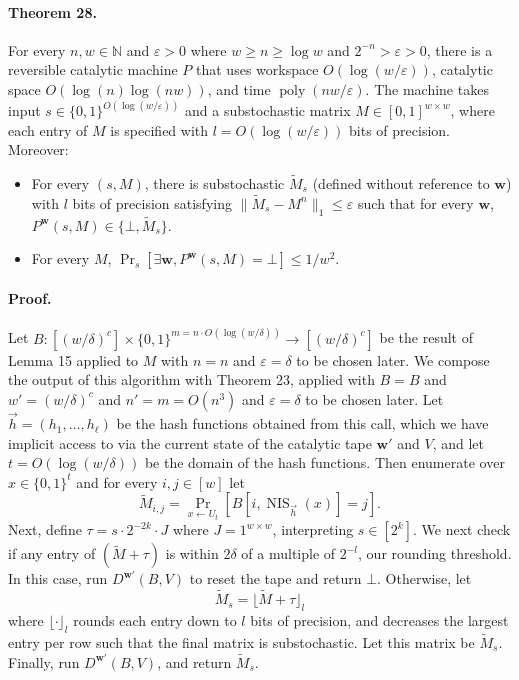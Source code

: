 \documentclass[10pt,a4paper]{article}
\begin{document}
\paragraph{Theorem 28.} For every $n,w\in\mathbb N$ and $\varepsilon>0$ where $w\geq n\geq\log w$ and $2^{-n}>\varepsilon>0$, there is a reversible catalytic machine $P$ that uses workspace $O(\log(w/\varepsilon))$, catalytic space $O(\log(n)\log(nw))$, and time $\operatorname{poly}(nw/\varepsilon)$. The machine takes input $s\in\{0,1\}^{O(\log(w/\varepsilon))}$ and a substochastic matrix $M\in[0,1]^{w\times w}$, where each entry of $M$ is specified with $l=O(\log(w/\varepsilon))$ bits of precision. Moreover:
\begin{itemize}
\item For every $(s,M)$, there is substochastic $\widetilde M_s$ (defined without reference to $\mathbf w$) with $l$ bits of precision satisfying $\|\widetilde M_s-M^n\|_1\leq\varepsilon$ such that for every $\mathbf w$, $P^{\mathbf w}(s,M)\in\{\bot,\widetilde M_s\}$.
\item For every $M$, $\Pr_s[\exists\mathbf w,P^{\mathbf w}(s,M)=\bot]\leq1/w^2$.
\end{itemize}
\paragraph{Proof.} Let $B:[(w/\delta)^c]\times\{0,1\}^{m=n\cdot O(\log(w/\delta))}\to[(w/\delta)^c]$ be the result of Lemma 15 applied to $M$ with $n=n$ and $\varepsilon=\delta$ to be chosen later. We compose the output of this algorithm with Theorem 23, applied with $B=B$ and $w'=(w/\delta)^c$ and $n'=m=O(n^3)$ and $\varepsilon=\delta$ to be chosen later. Let $\vec h=(h_1,\ldots,h_\ell)$ be the hash functions obtained from this call, which we have implicit access to via the current state of the catalytic tape $\mathbf w'$ and $V$, and let $t=O(\log(w/\delta))$ be the domain of the hash functions. Then enumerate over $x\in\{0,1\}^t$ and for every $i,j\in[w]$ let
\[\widetilde M_{i,j}=\Pr_{x\leftarrow U_t}[B[i,\operatorname{NIS}_{\vec h}(x)]=j].\]
Next, define $\tau=s\cdot2^{-2k}\cdot J$ where $J=1^{w\times w}$, interpreting $s\in[2^k]$. We next check if any entry of $(\widetilde M+\tau)$ is within $2\delta$ of a multiple of $2^{-l}$, our rounding threshold. In this case, run $D^{\mathbf w'}(B,V)$ to reset the tape and return $\bot$. Otherwise, let
\[\widetilde M_s=\lfloor\widetilde M+\tau\rfloor_l\]
where $\lfloor\cdot\rfloor_l$ rounds each entry down to $l$ bits of precision, and decreases the largest entry per row such that the final matrix is substochastic. Let this matrix be $\widetilde M_s$. Finally, run $D^{\mathbf w'}(B,V)$, and return $\widetilde M_s$.
\end{document}

